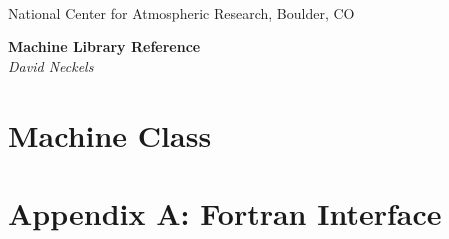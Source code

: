 \documentclass[]{article}
\begin{document}

\begin{titlepage}

\begin{latexonly}
 \\
\noindent National Center for Atmospheric Research, Boulder, CO \\
\vspace{2in}
\end{latexonly}

\begin{center}
{\Large\bf Machine Library Reference} \\
{\it David Neckels}
\end{center}

\end{titlepage}

\tableofcontents

\newpage


%

\section{Machine Class}



%



% 
%

\setcounter{section}{1}

\section*{Appendix A:  Fortran Interface}

%
\end{document}
